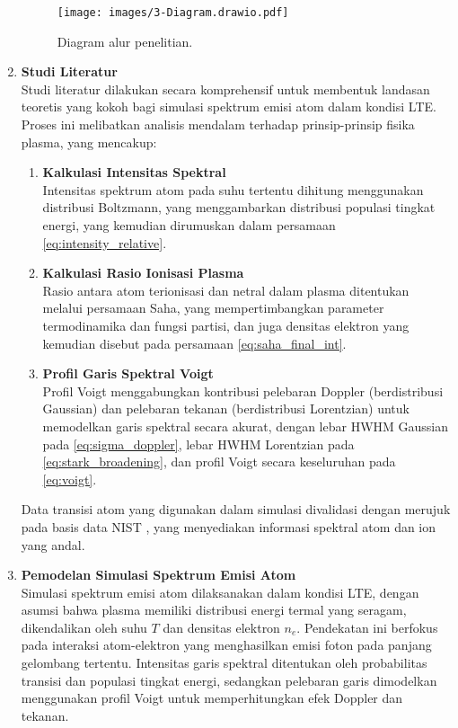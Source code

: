 \begin{enumerate}

    \begin{figure}[H]
        \centering
        \texttt{[image: images/3-Diagram.drawio.pdf]}
        \caption{Diagram alur penelitian.}
        \label{diagram}
    \end{figure}

    \item \textbf{Studi Literatur} \\
    Studi literatur dilakukan secara komprehensif untuk membentuk landasan teoretis yang kokoh bagi simulasi spektrum emisi atom dalam kondisi LTE. Proses ini melibatkan analisis mendalam terhadap prinsip-prinsip fisika plasma, yang mencakup:
    \begin{enumerate}
      \item \textbf{Kalkulasi Intensitas Spektral} \\
      Intensitas spektrum atom pada suhu tertentu dihitung menggunakan distribusi Boltzmann, yang menggambarkan distribusi populasi tingkat energi, yang kemudian dirumuskan dalam persamaan \eqref{eq:intensity_relative}.

      \item \textbf{Kalkulasi Rasio Ionisasi Plasma} \\
      Rasio antara atom terionisasi dan netral dalam plasma ditentukan melalui persamaan Saha, yang mempertimbangkan parameter termodinamika dan fungsi partisi, dan juga densitas elektron yang kemudian disebut pada persamaan \eqref{eq:saha_final_int}.

      \item \textbf{Profil Garis Spektral Voigt} \\
      Profil Voigt menggabungkan kontribusi pelebaran Doppler (berdistribusi Gaussian) dan pelebaran tekanan (berdistribusi Lorentzian) untuk memodelkan garis spektral secara akurat, dengan lebar HWHM Gaussian pada \eqref{eq:sigma_doppler}, lebar HWHM Lorentzian pada \eqref{eq:stark_broadening}, dan profil Voigt secara keseluruhan pada \eqref{eq:voigt}.
    \end{enumerate}

    Data transisi atom yang digunakan dalam simulasi divalidasi dengan merujuk pada basis data NIST \citep{Kramida2023}, yang menyediakan informasi spektral atom dan ion yang andal.

    \item \textbf{Pemodelan Simulasi Spektrum Emisi Atom} \\
    Simulasi spektrum emisi atom dilaksanakan dalam kondisi LTE, dengan asumsi bahwa plasma memiliki distribusi energi termal yang seragam, dikendalikan oleh suhu \(T\) dan densitas elektron \(n_e\). Pendekatan ini berfokus pada interaksi atom-elektron yang menghasilkan emisi foton pada panjang gelombang tertentu. Intensitas garis spektral ditentukan oleh probabilitas transisi dan populasi tingkat energi, sedangkan pelebaran garis dimodelkan menggunakan profil Voigt untuk memperhitungkan efek Doppler dan tekanan.


\end{enumerate}
